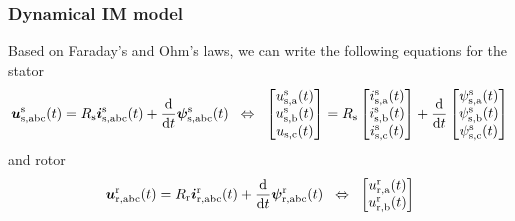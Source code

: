 \begin{frame}
	\frametitle{Dynamical IM model}
    Based on Faraday's and Ohm's laws, we can write the following equations for the stator 
    \begin{equation}
            \bm{u}^\mathrm{s}_\mathrm{s,abc}(t) = R_\mathrm{s}\bm{i}^\mathrm{s}_\mathrm{s,abc}(t)+\frac{\mathrm{d}}{\mathrm{d}t}\bm{\psi}^\mathrm{s}_\mathrm{s,abc}(t) \hspace{0.2cm} \Leftrightarrow \hspace{0.2cm} \begin{bmatrix}
                u_{\mathrm{s,a}}^\mathrm{s}(t)\\
                u_{\mathrm{s,b}}^\mathrm{s}(t)\\
                u_{\mathrm{s,c}}(t)\\
            \end{bmatrix} = R_\mathrm{s} \begin{bmatrix}
                i_{\mathrm{s,a}}^\mathrm{s}(t)\\
                i_{\mathrm{s,b}}^\mathrm{s}(t)\\
                i_{\mathrm{s,c}}^\mathrm{s}(t)\\
            \end{bmatrix} + \frac{\mathrm{d}}{\mathrm{d}t} \begin{bmatrix}
                \psi_{\mathrm{s,a}}^\mathrm{s}(t)\\
                \psi_{\mathrm{s,b}}^\mathrm{s}(t)\\
                \psi_{\mathrm{s,c}}^\mathrm{s}(t)\\
            \end{bmatrix}
            \label{eq:IM_stator_three_phase_voltage_equation}
    \end{equation}
    \pause
    and rotor
    \begin{equation}
            \bm{u}^\mathrm{r}_\mathrm{r,abc}(t) = R_\mathrm{r}\bm{i}^\mathrm{r}_\mathrm{r,abc}(t)+\frac{\mathrm{d}}{\mathrm{d}t}\bm{\psi}^\mathrm{r}_\mathrm{r,abc}(t) \hspace{0.2cm} \Leftrightarrow \hspace{0.2cm} \begin{bmatrix}
                u_{\mathrm{r,a}}^\mathrm{r}(t)\\
                u_{\mathrm{r,b}}^\mathrm{r}(t)\\

\end{bmatrix}
\end{equation}
\end{frame}
